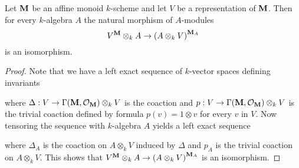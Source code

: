 \begin{proposition}\label{proposition:invariants_are_stable_under_tensoring_with_k_algebra}
Let $\mathbf{M}$ be an affine monoid $k$-scheme and let $V$ be a representation of $\mathbf{M}$. Then for every $k$-algebra $A$ the natural morphism of $A$-modules
$$V^{\mathbf{M}}\otimes_{k}A \rightarrow \left(A\otimes_kV\right)^{\mathbf{M}_A}$$
is an isomorphism.
\end{proposition}
\begin{proof}
Note that we have a left exact sequence of $k$-vector spaces defining invariants
\begin{center}
\end{center}
where $\Delta:V\rightarrow \Gamma(\mathbf{M},{\mathcal O}_{\mathbf{M}})\otimes_{k} V$ is the coaction and $p:V\rightarrow \Gamma(\mathbf{M},{\mathcal O}_{\mathbf{M}})\otimes_{k}V$ is the trivial coaction defined by formula $p(v)= 1\otimes v$ for every $v$ in $V$. Now tensoring the sequence with $k$-algebra $A$ yields a left exact sequence
\begin{center}
\end{center}
where $\Delta_A$ is the coaction on $A\otimes_kV$ induced by $\Delta$ and $p_A$ is the trivial coaction on $A\otimes_kV$. This shows that $V^{\mathbf{M}}\otimes_{k}A \rightarrow \left(A\otimes_kV\right)^{\mathbf{M}_A}$ is an isomorphism.
\end{proof}

